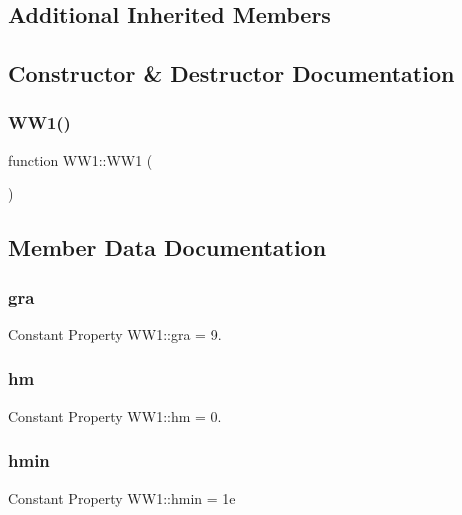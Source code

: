 \subsection*{Additional Inherited Members}


\subsection{Constructor \& Destructor Documentation}
\mbox{\label{class_w_w1_af74c0c61a425a0170a3162918f5a186a}} 
\subsubsection{\texorpdfstring{W\+W1()}{WW1()}}
{\footnotesize\ttfamily function W\+W1\+::\+W\+W1 (\begin{DoxyParamCaption}{ }\end{DoxyParamCaption})}



\subsection{Member Data Documentation}
\mbox{\label{class_w_w1_a767c45830543371bcdfcc73b98e81a81}} 
\subsubsection{\texorpdfstring{gra}{gra}}
{\footnotesize\ttfamily Constant Property W\+W1\+::gra = 9.}

\mbox{\label{class_w_w1_a40f59e6fdecc9008f6ccd6e9565364ef}} 
\subsubsection{\texorpdfstring{hm}{hm}}
{\footnotesize\ttfamily Constant Property W\+W1\+::hm = 0.}

\mbox{\label{class_w_w1_a8c6d9b344d8e83bbc60ce820168d28ac}} 
\subsubsection{\texorpdfstring{hmin}{hmin}}
{\footnotesize\ttfamily Constant Property W\+W1\+::hmin = 1e}

